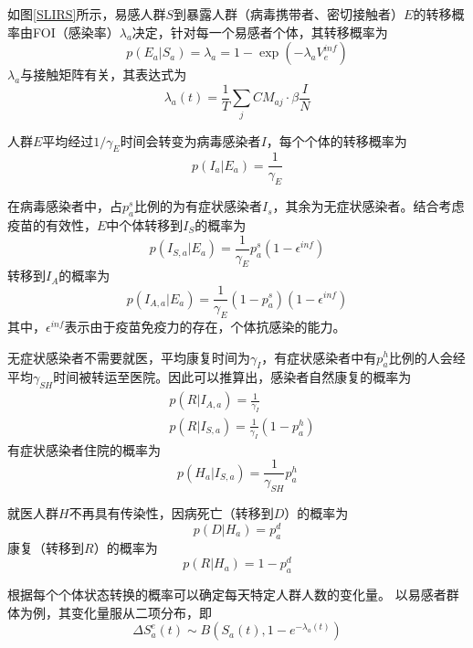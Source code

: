 \documentclass[bwprint]{gmcmthesis}
\numberwithin{figure}{section}
\begin{document}
如图\ref{SLIRS}所示，易感人群$S$到暴露人群（病毒携带者、密切接触者）$E$的转移概率由FOI（感染率）$\lambda_a$决定，针对每一个易感者个体，其转移概率为
\begin{equation}
p(E_a\vert S_a)=\lambda_a=1-\exp(-\lambda_aV_e^{inf}) 
\end{equation}
$\lambda_a$与接触矩阵有关，其表达式为
\begin{equation}
  \lambda_a(t)=\frac{1}{T}\sum_jCM_{aj}\cdot\beta\frac{I}{N}
\end{equation}
\par 人群$E$平均经过$1/\gamma_E$时间会转变为病毒感染者$I$，每个个体的转移概率为
\begin{equation}
p(I_a\vert E_a)=\frac{1}{\gamma_E}
\end{equation}
\par 在病毒感染者中，占$p_a^s$比例的为有症状感染者$I_s$，其余为无症状感染者。结合考虑疫苗的有效性，$E$中个体转移到$I_S$的概率为
\begin{equation}
p(I_{S,a}\vert E_a)=\frac{1}{\gamma_E}p_a^s(1-\epsilon^{inf})
\end{equation}
转移到$I_A$的概率为
\begin{equation}
p(I_{A,a}\vert E_a)=\frac{1}{\gamma_E}(1-p_a^s)(1-\epsilon^{inf})
\end{equation}
其中，$\epsilon^{inf}$表示由于疫苗免疫力的存在，个体抗感染的能力。
\par 无症状感染者不需要就医，平均康复时间为$\gamma_I$，有症状感染者中有$p_a^h$比例的人会经平均$\gamma_{SH}$时间被转运至医院。因此可以推算出，感染者自然康复的概率为
\begin{equation}
\begin{aligned}
&p(R\vert I_{A,a})=\frac{1}{\gamma_I}\\
&p(R\vert I_{S,a})=\frac{1}{\gamma_I}(1-p_a^h)
\end{aligned}
\end{equation}
有症状感染者住院的概率为
\begin{equation}
p(H_{a}\vert I_{S,a})=\frac{1}{\gamma_{SH}}p_a^h
\end{equation}
\par 就医人群$H$不再具有传染性，因病死亡（转移到$D$）的概率为
\begin{equation}
p(D\vert H_a)=p_a^d
\end{equation}
康复（转移到$R$）的概率为
\begin{equation}
p(R\vert H_a)=1-p_a^d
\end{equation}
\par 根据每个个体状态转换的概率可以确定每天特定人群人数的变化量。
以易感者群体为例，其变化量服从二项分布，即
\begin{equation}
\Delta S^e_a(t)\sim B(S_a(t),1-e^{-\lambda_a(t)})
\end{equation}
\end{document}

